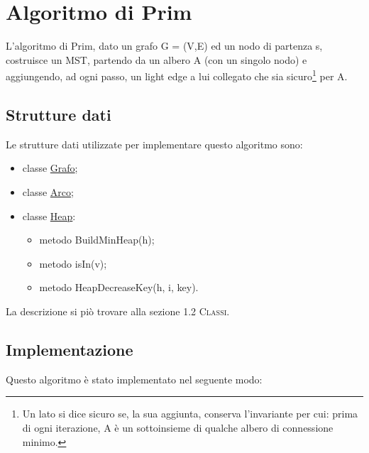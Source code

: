 \section{Algoritmo di Prim}
\label{Prim1}

L'algoritmo di Prim, dato un grafo G = (V,E) ed un nodo di partenza s, costruisce un MST, partendo da un albero A (con un singolo nodo) e aggiungendo, ad ogni passo, un light edge a lui collegato che sia sicuro\footnote{Un lato si dice sicuro se, la sua aggiunta, conserva l'invariante per cui: prima di ogni iterazione, A è un sottoinsieme di qualche albero di connessione minimo.} per A.

\subsection{Strutture dati}
\label{struttureDati1}

Le strutture dati utilizzate per implementare questo algoritmo sono:

\begin{itemize}
    \item classe \hyperlink{subsection.2.2}{Grafo};
    \item classe \hyperlink{subsection.2.1}{Arco};
    \item classe \hyperlink{subsection.2.5}{Heap}:
    \begin{itemize}
        \item metodo BuildMinHeap(h);
        \item metodo isIn(v);
        \item metodo HeapDecreaseKey(h, i, key).
    \end{itemize}
\end{itemize}

La descrizione si piò trovare alla sezione \textsc{1.2 Classi}.

\subsection{Implementazione}
\label{implementazione1}

Questo algoritmo è stato implementato nel seguente modo:

